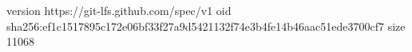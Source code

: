 version https://git-lfs.github.com/spec/v1
oid sha256:ef1c1517895c172e06bf33f27a9d5421132f74e3b4fe14b46aac51ede3700cf7
size 11068
